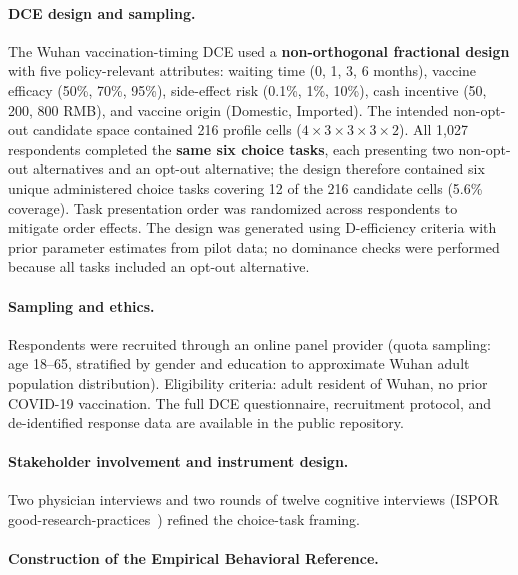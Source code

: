 \documentclass[11pt]{article}
\begin{document}
\paragraph{DCE design and sampling.}

The Wuhan vaccination-timing DCE used a \textbf{non-orthogonal fractional design} with five policy-relevant attributes: waiting time (0, 1, 3, 6 months), vaccine efficacy (50\%, 70\%, 95\%), side-effect risk (0.1\%, 1\%, 10\%), cash incentive (50, 200, 800 RMB), and vaccine origin (Domestic, Imported). The intended non-opt-out candidate space contained 216 profile cells ($4 \times 3 \times 3 \times 3 \times 2$). All 1,027 respondents completed the \textbf{same six choice tasks}, each presenting two non-opt-out alternatives and an opt-out alternative; the design therefore contained six unique administered choice tasks covering 12 of the 216 candidate cells (5.6\% coverage). Task presentation order was randomized across respondents to mitigate order effects. The design was generated using D-efficiency criteria with prior parameter estimates from pilot data; no dominance checks were performed because all tasks included an opt-out alternative.

\paragraph{Sampling and ethics.}

Respondents were recruited through an online panel provider (quota sampling: age 18--65, stratified by gender and education to approximate Wuhan adult population distribution). Eligibility criteria: adult resident of Wuhan, no prior COVID-19 vaccination. The full DCE questionnaire, recruitment protocol, and de-identified response data are available in the public repository.

\paragraph{Stakeholder involvement and instrument design.}

Two physician interviews and two rounds of twelve cognitive interviews (ISPOR good-research-practices~\citep{Johnson2013DCE,Bridges2013DCE}) refined the choice-task framing.

\paragraph{Construction of the Empirical Behavioral Reference.}
\end{document}
